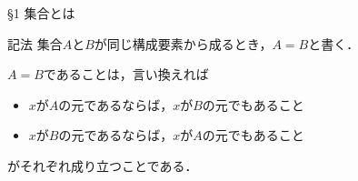 \documentclass[uplatex,a4paper,dvipdfmx,aspectratio=169,11pt]{beamer}
\begin{document}
\begin{frame}[fragile]{\S 1 集合とは}
    \begin{block}{記法}
        集合$A$と$B$が同じ構成要素から成るとき，$A = B$と書く．
    \end{block}
    \medskip

    $A = B$であることは，言い換えれば
    \begin{itemize}
        \item $x$が$A$の元であるならば，$x$が$B$の元でもあること
        \item $x$が$B$の元であるならば，$x$が$A$の元でもあること
    \end{itemize}
    がそれぞれ成り立つことである．
\end{frame}
\end{document}
